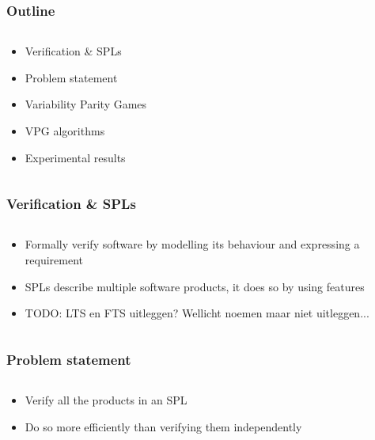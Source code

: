 \documentclass[handout,aspectratio=169]{beamer}
\begin{document}
\begin{frame}[t]
\frametitle{Outline}
\begin{columns}[t]
	\begin{column}{0.5\textwidth}
		\begin{itemize}
			\item Verification \& SPLs
			\item Problem statement
			\item Variability Parity Games
			\item VPG algorithms
			\item Experimental results
		\end{itemize}
	\end{column}
	\begin{column}{0.5\textwidth}
	\end{column}
\end{columns}
\end{frame}


\begin{frame}[t]
\frametitle{Verification \& SPLs}
\begin{columns}[t]
	\begin{column}{0.5\textwidth}
		\begin{itemize}
			\item Formally verify software by modelling its behaviour and expressing a requirement
			\item SPLs describe multiple software products, it does so by using features
			\item TODO: LTS en FTS uitleggen? Wellicht noemen maar niet uitleggen...
		\end{itemize}
	\end{column}
	\begin{column}{0.5\textwidth}
	\end{column}
\end{columns}
\end{frame}

\begin{frame}[t]
\frametitle{Problem statement}
\begin{columns}[t]
\begin{column}{0.5\textwidth}
	\begin{itemize}
		\item Verify all the products in an SPL
		\item Do so more efficiently than verifying them independently
	\end{itemize}
\end{column}
\begin{column}{0.5\textwidth}
\end{column}
\end{columns}
\end{frame}
\end{document}
